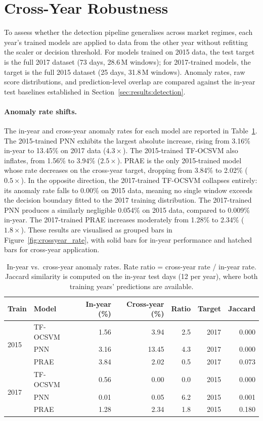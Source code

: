 \documentclass[11pt]{report}
\begin{document}
\section{Cross-Year Robustness}\label{sec:results:crossyear}

To assess whether the detection pipeline generalises across market regimes, each year's trained models are applied to data from the other year without refitting the scaler or decision threshold. For models trained on 2015 data, the test target is the full 2017 dataset (73 days, 28.6\,M windows); for 2017-trained models, the target is the full 2015 dataset (25 days, 31.8\,M windows). Anomaly rates, raw score distributions, and prediction-level overlap are compared against the in-year test baselines established in Section~\ref{sec:results:detection}.

\paragraph{Anomaly rate shifts.}
The in-year and cross-year anomaly rates for each model are reported in Table~\ref{tab:crossyear}. The 2015-trained PNN exhibits the largest absolute increase, rising from 3.16\% in-year to 13.45\% on 2017 data ($4.3\times$). The 2015-trained TF-OCSVM also inflates, from 1.56\% to 3.94\% ($2.5\times$). PRAE is the only 2015-trained model whose rate decreases on the cross-year target, dropping from 3.84\% to 2.02\% ($0.5\times$). In the opposite direction, the 2017-trained TF-OCSVM collapses entirely: its anomaly rate falls to 0.00\% on 2015 data, meaning no single window exceeds the decision boundary fitted to the 2017 training distribution. The 2017-trained PNN produces a similarly negligible 0.054\% on 2015 data, compared to 0.009\% in-year. The 2017-trained PRAE increases moderately from 1.28\% to 2.34\% ($1.8\times$). These results are visualised as grouped bars in Figure~\ref{fig:crossyear_rate}, with solid bars for in-year performance and hatched bars for cross-year application.

\begin{table}[H]
\centering
\small
\caption{In-year vs.\ cross-year anomaly rates. Rate ratio = cross-year rate / in-year rate. Jaccard similarity is computed on the in-year test days (12 per year), where both training years' predictions are available.}
\label{tab:crossyear}
\begin{tabular}{llrrrrr}
\toprule
Train & Model & In-year (\%) & Cross-year (\%) & Ratio & Target & Jaccard \\
\midrule
\multirow{3}{*}{2015}
 & TF-OCSVM &  1.56 &  3.94 & 2.5 & 2017 & 0.000 \\
 & PNN      &  3.16 & 13.45 & 4.3 & 2017 & 0.000 \\
 & PRAE     &  3.84 &  2.02 & 0.5 & 2017 & 0.073 \\
\midrule
\multirow{3}{*}{2017}
 & TF-OCSVM &  0.56 &  0.00 & 0.0 & 2015 & 0.000 \\
 & PNN      &  0.01 &  0.05 & 6.2 & 2015 & 0.001 \\
 & PRAE     &  1.28 &  2.34 & 1.8 & 2015 & 0.180 \\
\bottomrule
\end{tabular}
\end{table}
\end{document}
